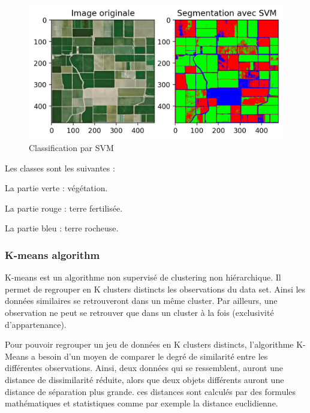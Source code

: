 \documentclass[12pt, openany]{report}
\begin{document}
\begin{figure}[H]
\centering
\hspace*{-0.5in}
\includegraphics[scale=1.2]{classification.png}
\caption{Classification par SVM}
\end{figure}

\noindent Les classes sont les suivantes : 

\begin{mylist}
\item La partie verte : végétation.
\item La partie rouge : terre fertilisée.
\item La partie bleu : terre rocheuse.
\end{mylist}

\subsubsection{K-means algorithm}


K-means \cite{k-means definition} est un algorithme non supervisé de clustering non hiérarchique. Il permet de regrouper en K clusters distincts les observations du data set. Ainsi les données similaires se retrouveront  dans un même cluster. Par ailleurs, une observation ne peut se retrouver que dans un cluster à la fois (exclusivité d’appartenance). 



Pour pouvoir regrouper un jeu de données en K clusters distincts, l’algorithme K-Means a besoin d’un moyen de comparer le degré de similarité entre les différentes observations. Ainsi, deux données qui se ressemblent, auront une distance de dissimilarité  réduite, alors que deux objets différents auront une distance de séparation plus grande. ces distances sont calculés par des formules mathématiques et statistiques comme par exemple la distance euclidienne.
\end{document}
